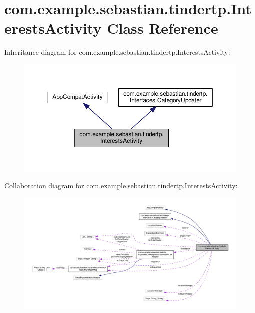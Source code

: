 \hypertarget{classcom_1_1example_1_1sebastian_1_1tindertp_1_1InterestsActivity}{}\section{com.\+example.\+sebastian.\+tindertp.\+Interests\+Activity Class Reference}
\label{classcom_1_1example_1_1sebastian_1_1tindertp_1_1InterestsActivity}


Inheritance diagram for com.\+example.\+sebastian.\+tindertp.\+Interests\+Activity\+:\nopagebreak
\begin{figure}[H]
\begin{center}
\leavevmode
\includegraphics[width=350pt]{classcom_1_1example_1_1sebastian_1_1tindertp_1_1InterestsActivity__inherit__graph}
\end{center}
\end{figure}


Collaboration diagram for com.\+example.\+sebastian.\+tindertp.\+Interests\+Activity\+:\nopagebreak
\begin{figure}[H]
\begin{center}
\leavevmode
\includegraphics[width=350pt]{classcom_1_1example_1_1sebastian_1_1tindertp_1_1InterestsActivity__coll__graph}
\end{center}
\end{figure}
